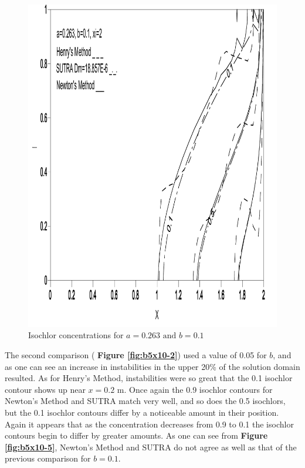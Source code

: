 \documentclass{article}
\newcommand{\spbox}[1]{ \text{ #1 }} %
\begin{document}
\begin{figure}[htp] \centering
    \includegraphics[totalheight=0.45 \textheight,viewport=3mm 4mm 205mm 292mm]
    {image2}
    \caption{Isochlor concentrations for $a = 0.263 \spbox{and} b =
    0.1$} \label{fig:b10-1}
\end{figure}

The second comparison ( \textbf{Figure \ref{fig:b5x10-2}}) used a value of 0.05 for
$b$, and as one can see an increase in instabilities in the upper 20\% of the
solution domain resulted. As for Henry's Method, instabilities were so great
that the 0.1 isochlor contour shows up near $x=0.2 \text{ m} $. Once again the
0.9 isochlor contours for Newton's Method and SUTRA match very well, and so does
the 0.5 isochlors, but the 0.1 isochlor contours differ by a noticeable amount
in their position. Again it appears that as the concentration decreases from 0.9
to 0.1 the isochlor contours begin to differ by greater amounts. As one can see
from \textbf{Figure \ref{fig:b5x10-5}}, Newton's Method and SUTRA do not agree as
well as that of the previous comparison for $b=0.1$.
\end{document}
